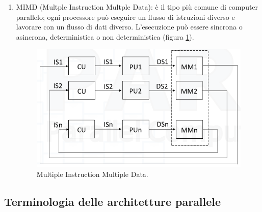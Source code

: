 \begin{enumerate}
	\item MIMD (Multple Instruction Multple Data): è il tipo più comune di computer parallelo; ogni processore può eseguire un flusso di istruzioni diverso e lavorare con un flusso di dati diverso. L'esecuzione può essere sincrona o asincrona, deterministica o non deterministica (figura \ref{fig:mimd}).
	\begin{figure}[!th]
		\centering
		\includegraphics[width=0.7\linewidth]{img/mimd}
		\caption{Multiple Instruction Multiple Data.}
		\label{fig:mimd}
	\end{figure}

\end{enumerate}
\subsection{Terminologia delle architetture parallele}

